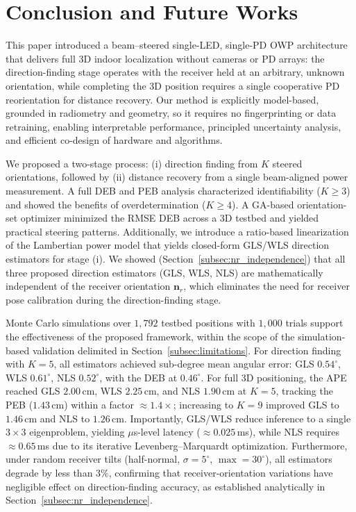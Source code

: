\documentclass[journal]{IEEEtran}
\begin{document}
\section{Conclusion and Future Works}
\label{sec:Conclusion}

This paper introduced a beam–steered single-LED, single-PD OWP architecture that delivers full 3D indoor localization without cameras or PD arrays: the direction-finding stage operates with the receiver held at an arbitrary, unknown orientation, while completing the 3D position requires a single cooperative PD reorientation for distance recovery. Our method is explicitly model-based, grounded in radiometry and geometry, so it requires no fingerprinting or data retraining, enabling interpretable performance, principled uncertainty analysis, and efficient co-design of hardware and algorithms.

We proposed a two-stage process: (i) direction finding from \(K\) steered orientations, followed by (ii) distance recovery from a single beam-aligned power measurement. A full DEB and PEB analysis characterized identifiability (\(K\!\ge\!3\)) and showed the benefits of overdetermination (\(K\!\ge\!4\)). A GA-based orientation-set optimizer minimized the RMSE DEB across a 3D testbed and yielded practical steering patterns. Additionally, we introduce a ratio-based linearization of the Lambertian power model that yields closed-form GLS/WLS direction estimators for stage (i). We showed (Section~\ref{subsec:nr_independence}) that all three proposed direction estimators (GLS, WLS, NLS) are mathematically independent of the receiver orientation $\mathbf{n}_r$, which eliminates the need for receiver pose calibration during the direction-finding stage.

Monte Carlo simulations over $1{,}792$ testbed positions with $1{,}000$ trials support the effectiveness of the proposed framework, within the scope of the simulation-based validation delimited in Section~\ref{subsec:limitations}. For direction finding with $K=5$, all estimators achieved sub-degree mean angular error: GLS $0.54^\circ$, WLS $0.61^\circ$, NLS $0.52^\circ$, with the DEB at $0.46^\circ$. For full 3D positioning, the APE reached GLS $2.00$\,cm, WLS $2.25$\,cm, and NLS $1.90$\,cm at $K=5$, tracking the PEB ($1.43$\,cm) within a factor $\approx1.4\times$; increasing to $K=9$ improved GLS to $1.46$\,cm and NLS to $1.26$\,cm. Importantly, GLS/WLS reduce inference to a single $3\times3$ eigenproblem, yielding $\mu$s-level latency ($\approx0.025$\,ms), while NLS requires $\approx0.65$\,ms due to its iterative Levenberg--Marquardt optimization. Furthermore, under random receiver tilts (half-normal, $\sigma=5^\circ$, $\max=30^\circ$), all estimators degrade by less than $3\%$, confirming that receiver-orientation variations have negligible effect on direction-finding accuracy, as established analytically in Section~\ref{subsec:nr_independence}.
\end{document}
